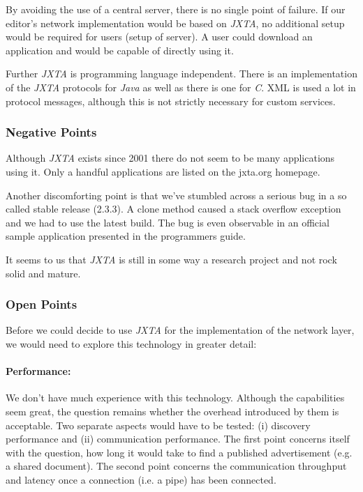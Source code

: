 By avoiding the use of a central server, there is no single point of failure. If our editor's network implementation would be based on \emph{JXTA}, no additional setup would be required for users (setup of server). A user could download an application and would be capable of directly using it.

Further \emph{JXTA} is programming language independent. There is an implementation of the \emph{JXTA} protocols for \emph{Java} as well as there is one for \emph{C}. XML is used a lot in protocol messages, although this is not strictly necessary for custom services.

\subsubsection{Negative Points}
Although \emph{JXTA} exists since 2001 there do not seem to be many applications using it. Only a handful applications are listed on the jxta.org homepage.

Another discomforting point is that we've stumbled across a serious bug in a so called stable release (2.3.3). A clone method caused a stack overflow exception and we had to use the latest build. The bug is even observable in an official sample application presented in the programmers guide.

It seems to us that \emph{JXTA} is still in some way a research project and not rock solid and mature.

\subsubsection{Open Points}
Before we could decide to use \emph{JXTA} for the implementation of the network layer, we would need to explore this technology in greater detail:

\paragraph{Performance:} We don't have much experience with this technology. Although the capabilities seem great, the question remains whether the overhead introduced by them is acceptable. Two separate aspects would have to be tested: (i) discovery performance and (ii) communication performance. The first point concerns itself with the question, how long it would take to find a published advertisement (e.g. a shared document). The second point concerns the communication throughput and latency once a connection (i.e. a pipe) has been connected.

